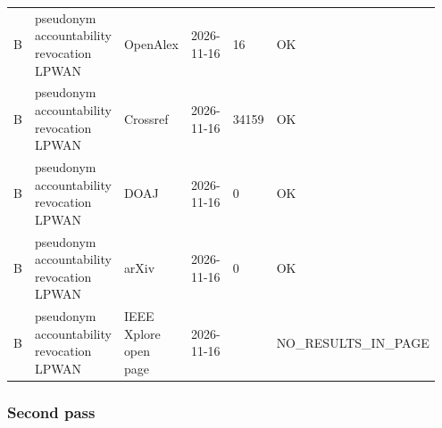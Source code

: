 {\begin{longtable}{p{0.158\linewidth}p{0.158\linewidth}p{0.158\linewidth}p{0.158\linewidth}p{0.158\linewidth}p{0.158\linewidth}}
B & pseudonym accountability revocation LPWAN & OpenAlex & 2026-11-16 & 16 & OK \\
B & pseudonym accountability revocation LPWAN & Crossref & 2026-11-16 & 34159 & OK \\
B & pseudonym accountability revocation LPWAN & DOAJ & 2026-11-16 & 0 & OK \\
B & pseudonym accountability revocation LPWAN & arXiv & 2026-11-16 & 0 & OK \\
B & pseudonym accountability revocation LPWAN & IEEE Xplore open page & 2026-11-16 &  & NO\_RESULTS\_IN\_PAGE \\
\bottomrule
\end{longtable}}

\subsubsection*{Second pass}

